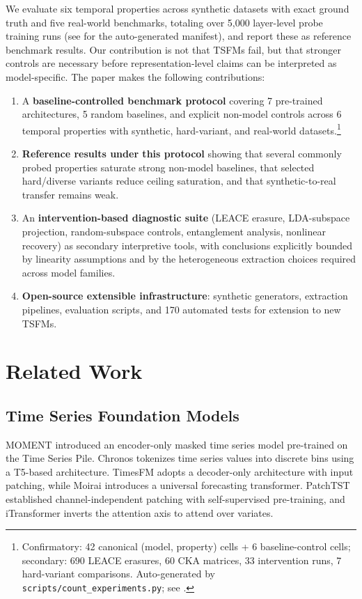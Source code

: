 \documentclass{article}
\begin{document}
We evaluate six temporal properties across synthetic datasets with exact ground truth and five
real-world benchmarks, totaling over 5{,}000 layer-level probe training runs (see
 for the auto-generated manifest), and report these as reference
benchmark results. Our contribution is not that TSFMs fail, but that stronger controls are necessary before representation-level claims can be interpreted as model-specific. The paper makes the following contributions:
\begin{enumerate}
    \item A \textbf{baseline-controlled benchmark protocol} covering 7 pre-trained architectures,
    5 random baselines, and explicit non-model controls across 6 temporal properties with
    synthetic, hard-variant, and real-world datasets.\footnote{Confirmatory: 42 canonical
    (model, property) cells + 6 baseline-control cells; secondary: 690 LEACE erasures,
    60 CKA matrices, 33 intervention runs, 7 hard-variant comparisons. Auto-generated by
    \texttt{scripts/count\_experiments.py}; see .}
    \item \textbf{Reference results under this protocol} showing that several commonly probed
    properties saturate strong non-model baselines, that selected hard/diverse variants reduce
    ceiling saturation, and that synthetic-to-real transfer remains weak.
    \item An \textbf{intervention-based diagnostic suite} (LEACE erasure, LDA-subspace
    projection, random-subspace controls, entanglement analysis, nonlinear recovery) as secondary
    interpretive tools, with conclusions explicitly bounded by linearity assumptions and by the
    heterogeneous extraction choices required across model families.
    \item \textbf{Open-source extensible infrastructure}: synthetic generators, extraction
    pipelines, evaluation scripts, and 170 automated tests for extension to new TSFMs.
\end{enumerate}

\section{Related Work}

\subsection{Time Series Foundation Models}

MOMENT \cite{Goswami2024} introduced an encoder-only masked time series model pre-trained on the Time Series Pile. Chronos \cite{Ansari2024} tokenizes time series values into discrete bins using a T5-based architecture. TimesFM \cite{Das2024} adopts a decoder-only architecture with input patching, while Moirai \cite{Woo2024} introduces a universal forecasting transformer. PatchTST \cite{Nie2023} established channel-independent patching with self-supervised pre-training, and iTransformer \cite{Liu2024a} inverts the attention axis to attend over variates.
\end{document}
